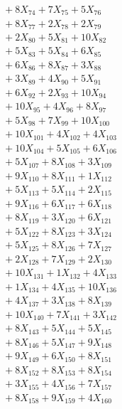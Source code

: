 \documentclass[a4paper,10pt]{article}
\begin{document}
{\begin{align}
&\;  + 8 X_{74} + 7 X_{75} + 5 X_{76} \\[0.3ex]
&\;  + 8 X_{77} + 2 X_{78} + 2 X_{79} \\[0.3ex]
&\;  + 2 X_{80} + 5 X_{81} + 10 X_{82} \\[0.3ex]
&\;  + 5 X_{83} + 5 X_{84} + 6 X_{85} \\[0.3ex]
&\;  + 6 X_{86} + 8 X_{87} + 3 X_{88} \\[0.3ex]
&\;  + 3 X_{89} + 4 X_{90} + 5 X_{91} \\[0.3ex]
&\;  + 6 X_{92} + 2 X_{93} + 10 X_{94} \\[0.3ex]
&\;  + 10 X_{95} + 4 X_{96} + 8 X_{97} \\[0.3ex]
&\;  + 5 X_{98} + 7 X_{99} + 10 X_{100} \\[0.3ex]
&\;  + 10 X_{101} + 4 X_{102} + 4 X_{103} \\[0.5ex]\allowbreak
&\;  + 10 X_{104} + 5 X_{105} + 6 X_{106} \\[0.3ex]
&\;  + 5 X_{107} + 8 X_{108} + 3 X_{109} \\[0.3ex]
&\;  + 9 X_{110} + 8 X_{111} + 1 X_{112} \\[0.3ex]
&\;  + 5 X_{113} + 5 X_{114} + 2 X_{115} \\[0.3ex]
&\;  + 9 X_{116} + 6 X_{117} + 6 X_{118} \\[0.3ex]
&\;  + 8 X_{119} + 3 X_{120} + 6 X_{121} \\[0.3ex]
&\;  + 5 X_{122} + 8 X_{123} + 3 X_{124} \\[0.3ex]
&\;  + 5 X_{125} + 8 X_{126} + 7 X_{127} \\[0.3ex]
&\;  + 2 X_{128} + 7 X_{129} + 2 X_{130} \\[0.3ex]
&\;  + 10 X_{131} + 1 X_{132} + 4 X_{133} \\[0.5ex]\allowbreak
&\;  + 1 X_{134} + 4 X_{135} + 10 X_{136} \\[0.3ex]
&\;  + 4 X_{137} + 3 X_{138} + 8 X_{139} \\[0.3ex]
&\;  + 10 X_{140} + 7 X_{141} + 3 X_{142} \\[0.3ex]
&\;  + 8 X_{143} + 5 X_{144} + 5 X_{145} \\[0.3ex]
&\;  + 8 X_{146} + 5 X_{147} + 9 X_{148} \\[0.3ex]
&\;  + 9 X_{149} + 6 X_{150} + 8 X_{151} \\[0.3ex]
&\;  + 8 X_{152} + 8 X_{153} + 8 X_{154} \\[0.3ex]
&\;  + 3 X_{155} + 4 X_{156} + 7 X_{157} \\[0.3ex]
&\;  + 8 X_{158} + 9 X_{159} + 4 X_{160} \\[0.3ex]

\end{align}}
\end{document}
